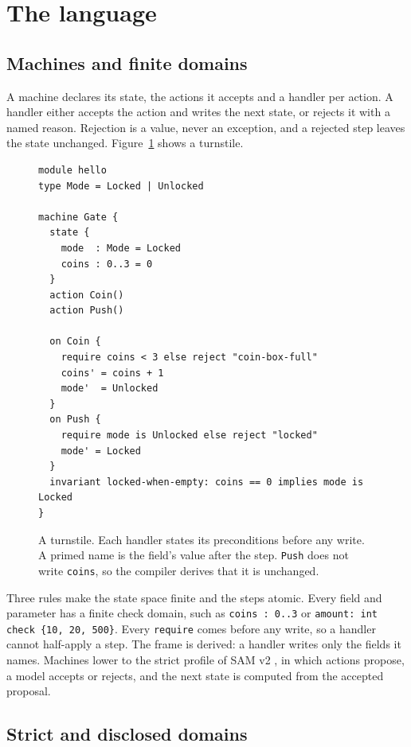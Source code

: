 \documentclass[11pt]{article}
\begin{document}
\section{The language}
\label{sec:lang}

\subsection{Machines and finite domains}

A machine declares its state, the actions it accepts and a handler per action. A handler either accepts the action and writes the next state, or rejects it with a named reason. Rejection is a value, never an exception, and a rejected step leaves the state unchanged. Figure~\ref{fig:turnstile} shows a turnstile.

\begin{figure}[t]
\begin{lstlisting}
module hello
type Mode = Locked | Unlocked

machine Gate {
  state {
    mode  : Mode = Locked
    coins : 0..3 = 0
  }
  action Coin()
  action Push()

  on Coin {
    require coins < 3 else reject "coin-box-full"
    coins' = coins + 1
    mode'  = Unlocked
  }
  on Push {
    require mode is Unlocked else reject "locked"
    mode' = Locked
  }
  invariant locked-when-empty: coins == 0 implies mode is Locked
}
\end{lstlisting}
\caption{A turnstile. Each handler states its preconditions before any write. A primed name is the field's value after the step. \texttt{Push} does not write \texttt{coins}, so the compiler derives that it is unchanged.}
\label{fig:turnstile}
\end{figure}

Three rules make the state space finite and the steps atomic. Every field and parameter has a finite check domain, such as \texttt{coins : 0..3} or \texttt{amount: int check \{10, 20, 500\}}. Every \texttt{require} comes before any write, so a handler cannot half-apply a step. The frame is derived: a handler writes only the fields it names. Machines lower to the strict profile of SAM v2 \cite{dubray2016sam,samlib2026}, in which actions propose, a model accepts or rejects, and the next state is computed from the accepted proposal.

\subsection{Strict and disclosed domains}
\end{document}
